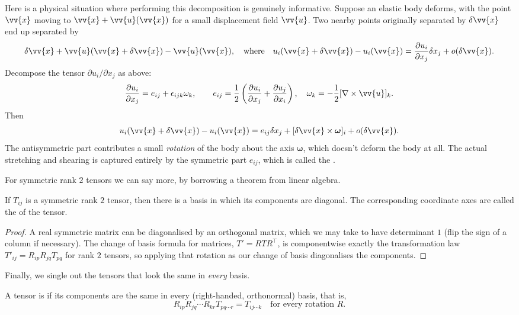 \begin{example}
	Here is a physical situation where performing this decomposition is genuinely informative. Suppose an elastic body deforms, with the point $\vv{x}$ moving to $\vv{x} + \vv{u}(\vv{x})$ for a small displacement field $\vv{u}$. Two nearby points originally separated by $\delta \vv{x}$ end up separated by
	$$
	\delta \vv{x} + \vv{u}(\vv{x} + \delta \vv{x}) - \vv{u}(\vv{x}), \quad \text{where} \quad u_i(\vv{x} + \delta \vv{x}) - u_i(\vv{x}) = \frac{\partial u_i}{\partial x_j} \delta x_j + o(\delta \vv{x}).
	$$
	Decompose the tensor $\partial u_i/\partial x_j$ as above:
	$$
	\frac{\partial u_i}{\partial x_j} = e_{ij} + \epsilon_{ijk}\omega_k, \quad \quad e_{ij} = \frac{1}{2}\left(\frac{\partial u_i}{\partial x_j} + \frac{\partial u_j}{\partial x_i}\right), \quad \omega_k = -\frac{1}{2}[\nabla \times \vv{u}]_k.
	$$
	Then
	$$
	u_i(\vv{x} + \delta \vv{x}) - u_i(\vv{x}) = e_{ij}\delta x_j + [\delta \vv{x} \times \boldsymbol{\omega}]_i + o(\delta \vv{x}).
	$$
	The antisymmetric part contributes a small \emph{rotation} of the body about the axis $\boldsymbol{\omega}$, which doesn't deform the body at all. The actual stretching and shearing is captured entirely by the symmetric part $e_{ij}$, which is called the .
\end{example}

For symmetric rank $2$ tensors we can say more, by borrowing a theorem from linear algebra.

\begin{proposition}
	If $T_{ij}$ is a symmetric rank $2$ tensor, then there is a basis in which its components are diagonal. The corresponding coordinate axes are called the  of the tensor.
\end{proposition}
\begin{proof}
	A real symmetric matrix can be diagonalised by an orthogonal matrix, which we may take to have determinant $1$ (flip the sign of a column if necessary). The change of basis formula for matrices, $T' = R T R^\top$, is componentwise exactly the transformation law $T'_{ij} = R_{ip}R_{jq}T_{pq}$ for rank $2$ tensors, so applying that rotation as our change of basis diagonalises the components.
\end{proof}

Finally, we single out the tensors that look the same in \emph{every} basis.

\begin{definition}
	A tensor is  if its components are the same in every (right-handed, orthonormal) basis, that is,
	$$
	R_{ip}R_{jq}\cdots R_{kr} T_{pq \cdots r} = T_{ij \cdots k} \quad \text{for every rotation } R.
	$$
\end{definition}

